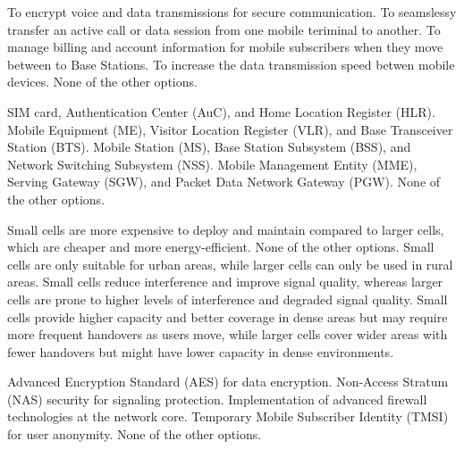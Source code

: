



\begin{checkboxes}
    \choice To encrypt voice and data transmissions for secure communication.
    \choice To seamslessy transfer an active call or data session from one mobile teriminal to another.
    \choice To manage billing and account information for mobile subscribers when they move between to Base Stations.
    \choice To increase the data transmission speed betwen mobile devices.
    \CorrectChoice None of the other options.
\end{checkboxes}

\begin{checkboxes}
    \CorrectChoice SIM card, Authentication Center (AuC), and Home Location Register (HLR).
    \choice Mobile Equipment (ME), Visitor Location Register (VLR), and Base Transceiver Station (BTS).
    \choice Mobile Station (MS), Base Station Subsystem (BSS), and Network Switching Subsystem (NSS).
    \choice Mobile Management Entity (MME), Serving Gateway (SGW), and Packet Data Network Gateway (PGW).
    \choice None of the other options.
\end{checkboxes}

\begin{checkboxes}
    \choice Small cells are more expensive to deploy and maintain compared to larger cells, which are cheaper and more energy-efficient.
    \choice None of the other options.
    \choice Small cells are only suitable for urban areas, while larger cells can only be used in rural areas.
    \choice Small cells reduce interference and improve signal quality, whereas larger cells are prone to higher levels of interference and degraded signal quality.
    \CorrectChoice Small cells provide higher capacity and better coverage in dense areas but may require more frequent handovers as users move, while larger cells cover wider areas with fewer handovers but might have lower capacity in dense environments.
\end{checkboxes}

\begin{checkboxes}
    \CorrectChoice Advanced Encryption Standard (AES) for data encryption.
    \CorrectChoice Non-Access Stratum (NAS) security for signaling protection.
    \choice Implementation of advanced firewall technologies at the network core.
    \choice Temporary Mobile Subscriber Identity (TMSI) for user anonymity.
    \choice None of the other options.
\end{checkboxes}

